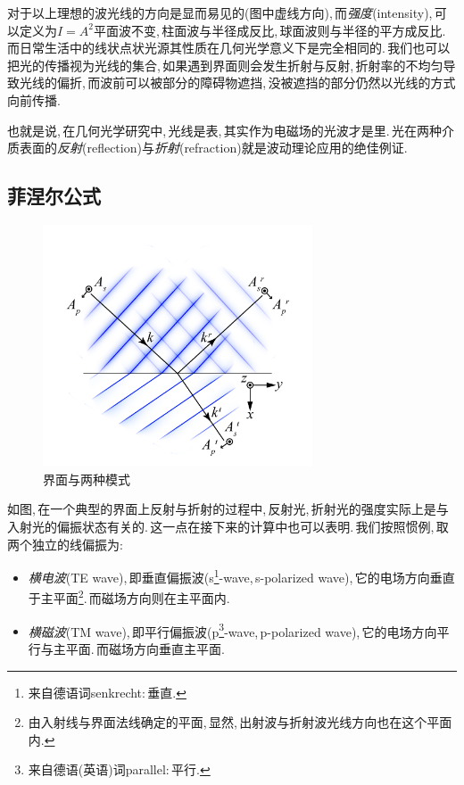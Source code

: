 对于以上理想的波光线的方向是显而易见的(图中虚线方向),\,而\emph{强度}(intensity),\,可以定义为$I=A^2$平面波不变,\,柱面波与半径成反比,\,球面波则与半径的平方成反比.\,而日常生活中的线状点状光源其性质在几何光学意义下是完全相同的.\,我们也可以把光的传播视为光线的集合,\,如果遇到界面则会发生折射与反射,\,折射率的不均匀导致光线的偏折,\,而波前可以被部分的障碍物遮挡,\,没被遮挡的部分仍然以光线的方式向前传播.

也就是说,\,在几何光学研究中,\,光线是表,\,其实作为电磁场的光波才是里.\,光在两种介质表面的\emph{反射}(reflection)与\emph{折射}(refraction)就是波动理论应用的绝佳例证.

\subsection{菲涅尔公式}

\begin{figure}
\centering
\vspace{-2cm}
\includegraphics[width=8cm]{image/5-6-4.png}
\caption{界面与两种模式}
\end{figure}
如图,\,在一个典型的界面上反射与折射的过程中,\,反射光,\,折射光的强度实际上是与入射光的偏振状态有关的.\,这一点在接下来的计算中也可以表明.\,我们按照惯例,\,取两个独立的线偏振为:
\begin{itemize}
	\item \emph{横电波}(TE wave),\,即垂直偏振波(s\footnote{来自德语词senkrecht:\,垂直.}-wave,\,s-polarized wave),\,它的电场方向垂直于主平面\footnote{由入射线与界面法线确定的平面,\,显然,\,出射波与折射波光线方向也在这个平面内.}.\,而磁场方向则在主平面内.
	\item \emph{横磁波}(TM wave),\,即平行偏振波(p\footnote{来自德语(英语)词parallel:\,平行.}-wave,\,p-polarized wave),\,它的电场方向平行与主平面.\,而磁场方向垂直主平面.
\end{itemize}

